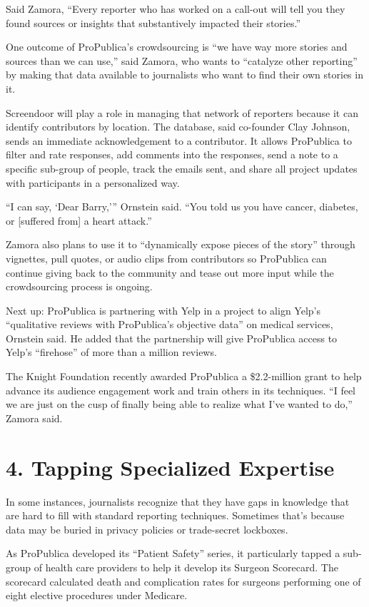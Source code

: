 \begin{itemize}
\begin{itemize}
\begin{enumerate}
{Said Zamora, “Every reporter who has worked on a call-out will tell you they found sources or insights that substantively impacted their stories.”

One outcome of ProPublica’s crowdsourcing is “we have way more stories and sources than we can use,” said Zamora, who wants to “catalyze other reporting” by making that data available to journalists who want to find their own stories in it.

Screendoor will play a role in managing that network of reporters because it can identify contributors by location. The database, said co-founder Clay Johnson, sends an immediate acknowledgement to a contributor. It allows ProPublica to filter and rate responses, add comments into the responses, send a note to a specific sub-group of people, track the emails sent, and share all project updates with participants in a personalized way. 

“I can say, ‘Dear Barry,’” Ornstein said. “You told us you have cancer, diabetes, or [suffered from] a heart attack.”

Zamora also plans to use it to “dynamically expose pieces of the story” through vignettes, pull quotes, or audio clips from contributors so ProPublica can continue giving back to the community and tease out more input while the crowdsourcing process is ongoing.\autocite{Zamora}

Next up: ProPublica is partnering with Yelp in a project to align Yelp’s “qualitative reviews with ProPublica’s objective data” on medical services, Ornstein said. He added that the partnership will give ProPublica access to Yelp’s “firehose” of more than a million reviews.\autocite{Ornstein}

The Knight Foundation recently awarded ProPublica a \$2.2-million grant to help advance its audience engagement work and train others in its techniques. “I feel we are just on the cusp of finally being able to realize what I’ve wanted to do,” Zamora said.


\section{4. Tapping Specialized Expertise}

In some instances, journalists recognize that they have gaps in knowledge that are hard to fill with standard reporting techniques. Sometimes that’s because data may be buried in privacy policies or trade-secret lockboxes. 

As ProPublica developed its “Patient Safety” series, it particularly tapped a sub-group of health care providers to help it develop its Surgeon Scorecard.\autocite{scorecard} The scorecard calculated death and complication rates for surgeons performing one of eight elective procedures under Medicare.

}
\end{enumerate}
\end{itemize}
\end{itemize}
